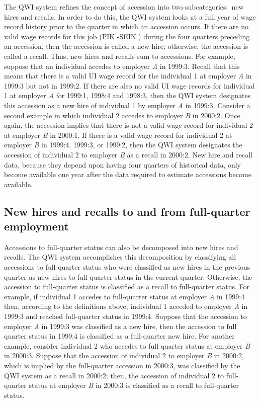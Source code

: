 The QWI system refines the concept of accession into two subcategories:\ new
hires and recalls. In order to do this, the QWI system looks at a full year
of wage record history prior to the quarter in which an accession occurs. If
there are no valid wage records for this job (PIK%
-SEIN%
) during the four quarters preceding an accession, then the
accession is called a new hire; otherwise, the accession is called a recall.
Thus, new hires and recalls sum to accessions. For example, suppose that an
individual accedes to employer \textit{A} in 1999:3. Recall that this means
that there is a valid UI%
 wage record for the individual 1 at employer \textit{A} in 1999:3
but not in 1999:2. If there are also no valid {UI} wage records for
individual 1 at employer \textit{A} for 1999:1, 1998:4 and 1998:3, then the
QWI system designates this accession as a new hire of individual 1 by
employer \textit{A} in 1999:3. Consider a second example in which individual
2 accedes to employer \textit{B} in 2000:2. Once again, the accession
implies that there is not a valid wage record for individual 2 at employer 
\textit{B} in 2000:1. If there is a valid wage record for individual 2 at
employer \textit{B} in 1999:4, 1999:3, or 1999:2, then the QWI system
designates the accession of individual 2 to employer \textit{B} as a recall
in 2000:2. New hire and recall data, because they depend upon having four
quarters of historical data, only become available one year after the data
required to estimate accessions become available.

\subsection{New hires and recalls to and from full-quarter employment}

 

Accessions to full-quarter status can also be decomposed into new hires and
recalls. The QWI system accomplishes this decomposition by classifying all
accessions to full-quarter status who were classified as new hires in the
previous quarter as new hires to full-quarter status in the current quarter.
Otherwise, the accession to full-quarter status is classified as a recall to
full-quarter status. For example, if individual 1 accedes to full-quarter
status at employer \textit{A} in 1999:4 then, according to the definitions
above, individual 1 acceded to employer \textit{A} in 1999:3 and reached
full-quarter status in 1999:4. Suppose that the accession to employer 
\textit{A} in 1999:3 was classified as a new hire, then the accession to
full quarter status in 1999:4 is classified as a full-quarter new hire. For
another example, consider individual 2 who accedes to full-quarter status at
employer \textit{B} in 2000:3. Suppose that the accession of individual 2 to
employer \textit{B} in 2000:2, which is implied by the full-quarter
accession in 2000:3, was classified by the QWI system as a recall in 2000:2;
then, the accession of individual 2 to full-quarter status at employer 
\textit{B} in 2000:3 is classified as a recall to full-quarter status.

